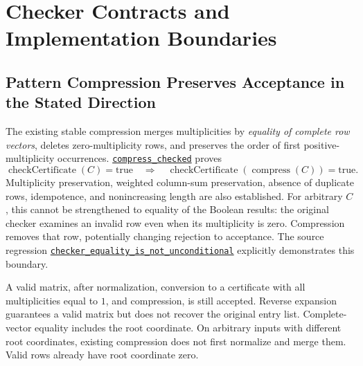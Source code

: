 \documentclass[11pt]{article}
\theoremstyle{remark}
\newcommand{\CC}{\operatorname{checkCertificate}}
\newcommand{\code}[1]{\nolinkurl{#1}}
\newcommand{\src}[2]{\href{https://github.com/huam54925-cpu/uav-routing-certification/blob/1bc992475a9bd515d77245e2bc0471e5ecab2fd5/LeanCompletion/UAV/#1.lean}{#2}}
\begin{document}
\section{Checker Contracts and Implementation Boundaries}

\subsection{Pattern Compression Preserves Acceptance in the Stated Direction}
The existing stable compression merges multiplicities by \emph{equality of complete row vectors}, deletes zero-multiplicity rows,
and preserves the order of first positive-multiplicity occurrences.
\src{TreeBudgetCertificateCompression}{\code{compress_checked}} proves
\[
 \CC(C)=\mathrm{true}\quad\Longrightarrow\quad
 \CC(\operatorname{compress}(C))=\mathrm{true}.
\]
Multiplicity preservation, weighted column-sum preservation, absence of duplicate rows, idempotence, and nonincreasing length are also established.
For arbitrary $C$, this cannot be strengthened to equality of the Boolean results: the original checker examines an invalid row even when its multiplicity is zero.
Compression removes that row, potentially changing rejection to acceptance.
The source regression
\src{TreeBudgetCertificateCompressionExamples}{
\code{checker_equality_is_not_unconditional}}
explicitly demonstrates this boundary.

A valid matrix, after normalization, conversion to a certificate with all multiplicities equal to $1$, and compression, is still accepted.
Reverse expansion guarantees a valid matrix but does not recover the original entry list.
Complete-vector equality includes the root coordinate. On arbitrary inputs with different root coordinates, existing compression does not first normalize and merge them.
Valid rows already have root coordinate zero.
\end{document}
